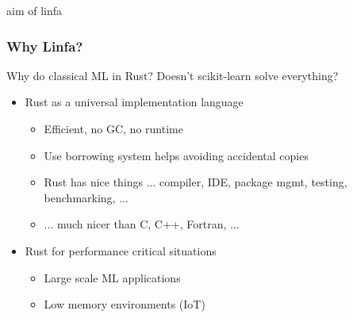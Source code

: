 \documentclass[xcolor=x11names,compress]{beamer}
\begin{document}
\begin{frame}{aim of linfa}
    \frametitle{Why Linfa?}
    Why do classical ML in Rust? Doesn't scikit-learn solve everything?
    \begin{itemize}
        \item<2-> Rust as a universal implementation language
        \begin{itemize}[label=-]
            \item<4->{Efficient, no GC, no runtime}
	    \item<5->{Use borrowing system helps avoiding accidental copies}
	    \item<5->{Rust has nice things ... compiler, IDE, package mgmt, testing, benchmarking, ...}
	    \item<6->{... much nicer than C, C++, Fortran, ...}
        \end{itemize}
	    \item<7-> Rust for performance critical situations
        \begin{itemize}[label=-]
            \item<8->{Large scale ML applications}
	    \item<9->{Low memory environments (IoT)}
        \end{itemize}	
    \end{itemize}
\end{frame}
\end{document}
